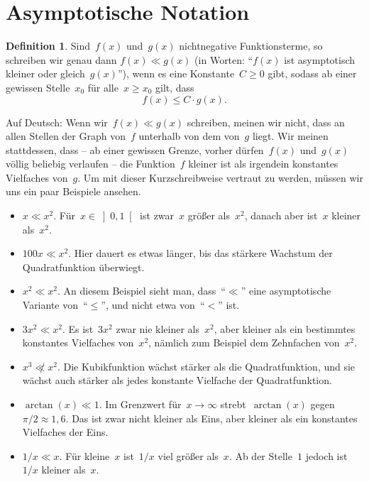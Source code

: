 \documentclass[twoside]{../zirkelblatt1415}
\theoremstyle{definition}
\newtheorem{defn}{Definition}[section]
\theoremstyle{plain}
\theoremstyle{remark}
\begin{document}
\section{Asymptotische Notation}

\begin{defn}Sind~$f(x)$ und~$g(x)$ nichtnegative Funktionsterme, so schreiben
wir genau dann $f(x) \ll g(x)$ (in Worten: "`$f(x)$ ist asymptotisch kleiner
oder gleich~$g(x)$"'), wenn es eine Konstante~$C \geq 0$ gibt, sodass ab einer
gewissen Stelle~$x_0$ für alle~$x \geq x_0$ gilt, dass
\[ f(x) \leq C \cdot g(x). \]
\end{defn}

Auf Deutsch: Wenn wir~$f(x) \ll g(x)$ schreiben, meinen wir nicht, dass an
allen Stellen der Graph von~$f$ unterhalb von dem von~$g$ liegt. Wir meinen
stattdessen, dass -- ab einer gewissen Grenze, vorher dürfen~$f(x)$ und~$g(x)$
völlig beliebig verlaufen -- die Funktion~$f$ kleiner ist als irgendein
konstantes Vielfaches von~$g$. Um mit dieser Kurzschreibweise vertraut zu
werden, müssen wir uns ein paar Beispiele ansehen.

\begin{itemize}
\item $x \ll x^2$. Für~$x \in \left]0,1\right[$ ist zwar~$x$ größer als~$x^2$, danach aber
ist~$x$ kleiner als~$x^2$.
\item $100x \ll x^2$. Hier dauert es etwas länger, bis das stärkere Wachstum
der Quadratfunktion überwiegt.
\item $x^2 \ll x^2$. An diesem Beispiel sieht man, dass~"`$\ll$"' eine
asymptotische Variante von~"`$\leq$"', und nicht etwa von~"`$<$"' ist.
\item $3x^2 \ll x^2$. Es ist~$3x^2$ zwar nie kleiner als~$x^2$,
aber kleiner als ein bestimmtes konstantes Vielfaches von~$x^2$, nämlich zum
Beispiel dem Zehnfachen von~$x^2$.
\item $x^3 \not\ll x^2$. Die Kubikfunktion wächst stärker als die
Quadratfunktion, und sie wächst auch stärker als jedes konstante Vielfache der
Quadratfunktion.
\item $\arctan(x) \ll 1$. Im Grenzwert für~$x \to \infty$ strebt~$\arctan(x)$
gegen~$\pi/2 \approx 1{,}6$. Das ist zwar nicht kleiner als Eins, aber kleiner
als ein konstantes Vielfaches der Eins.
\item $1/x \ll x$. Für kleine~$x$ ist~$1/x$ viel größer als~$x$. Ab der
Stelle~$1$ jedoch ist~$1/x$ kleiner als~$x$.
\end{itemize}
\end{document}

